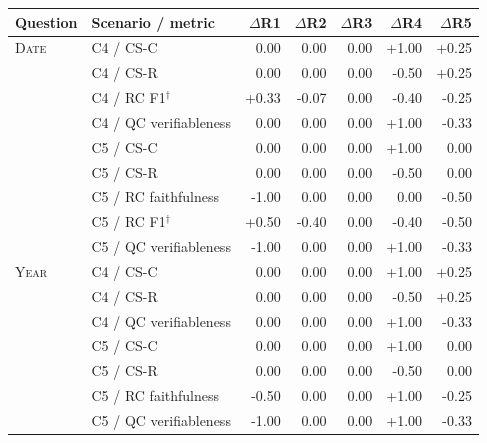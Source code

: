 \documentclass[11pt,a4paper]{article}
\newenvironment{brieftable}{\par\noindent\begin{minipage}{\linewidth}}{\end{minipage}}
\begin{document}
\begin{brieftable}
\label{tab:hedges}
{\small
\begin{tabular*}{\linewidth}{@{\extracolsep{\fill}}llrrrrr@{}}
\toprule
Question & Scenario / metric & $\Delta$R1 & $\Delta$R2 & $\Delta$R3 & $\Delta$R4 & $\Delta$R5 \\
\midrule
\textsc{Date} & C4 / CS-C & 0.00 & 0.00 & 0.00 & +1.00 & +0.25 \\
 & C4 / CS-R & 0.00 & 0.00 & 0.00 & -0.50 & +0.25 \\
 & C4 / RC F1$^\dagger$ & +0.33 & -0.07 & 0.00 & -0.40 & -0.25 \\
 & C4 / QC verifiableness & 0.00 & 0.00 & 0.00 & +1.00 & -0.33 \\
 & C5 / CS-C & 0.00 & 0.00 & 0.00 & +1.00 & 0.00 \\
 & C5 / CS-R & 0.00 & 0.00 & 0.00 & -0.50 & 0.00 \\
 & C5 / RC faithfulness & -1.00 & 0.00 & 0.00 & 0.00 & -0.50 \\
 & C5 / RC F1$^\dagger$ & +0.50 & -0.40 & 0.00 & -0.40 & -0.50 \\
 & C5 / QC verifiableness & -1.00 & 0.00 & 0.00 & +1.00 & -0.33 \\
\addlinespace[3pt]
\textsc{Year} & C4 / CS-C & 0.00 & 0.00 & 0.00 & +1.00 & +0.25 \\
 & C4 / CS-R & 0.00 & 0.00 & 0.00 & -0.50 & +0.25 \\
 & C4 / QC verifiableness & 0.00 & 0.00 & 0.00 & +1.00 & -0.33 \\
 & C5 / CS-C & 0.00 & 0.00 & 0.00 & +1.00 & 0.00 \\
 & C5 / CS-R & 0.00 & 0.00 & 0.00 & -0.50 & 0.00 \\
 & C5 / RC faithfulness & -0.50 & 0.00 & 0.00 & +1.00 & -0.25 \\
 & C5 / QC verifiableness & -1.00 & 0.00 & 0.00 & +1.00 & -0.33 \\
\bottomrule
\end{tabular*}}
\end{brieftable}\par\vspace{3pt}
\end{document}

